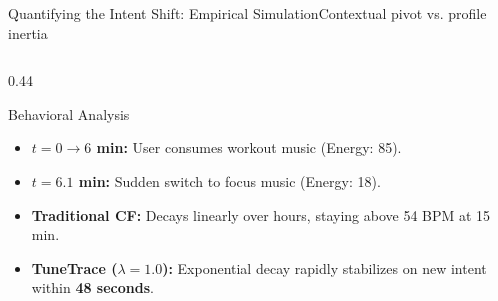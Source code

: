\documentclass[aspectratio=169,10pt]{beamer}
\begin{document}
\begin{frame}{Quantifying the Intent Shift: Empirical Simulation}{Contextual pivot vs. profile inertia}
\begin{columns}[c]
        \begin{column}{0.44\textwidth}
            \begin{block}{Behavioral Analysis}
                \fontsize{6.5pt}{8.5pt}\selectfont
                \begin{itemize}
                    \item \textbf{$t = 0 \to 6$ min:} User consumes workout music (Energy: 85).
                    \item \textbf{$t = 6.1$ min:} Sudden switch to focus music (Energy: 18).
                    \item \textbf{Traditional CF:} Decays linearly over hours, staying above 54 BPM at 15 min.
                    \item \textbf{TuneTrace ($\lambda=1.0$):} Exponential decay rapidly stabilizes on new intent within \textbf{48 seconds}.
                \end{itemize}
            \end{block}
        \end{column}
    \end{columns}
\end{frame}
\end{document}
